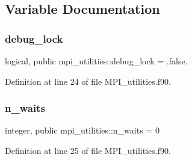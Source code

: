 \subsection{Variable Documentation}
\mbox{\label{namespacempi__utilities_a98291c400747762ea4e3f0d751c5d5f5}} 
\subsubsection{\texorpdfstring{debug\+\_\+lock}{debug\_lock}}
{\footnotesize\ttfamily logical, public mpi\+\_\+utilities\+::debug\+\_\+lock = .false.}



Definition at line 24 of file M\+P\+I\+\_\+utilities.\+f90.

\mbox{\label{namespacempi__utilities_a38a87fa6a7efbd985592bbef4750f02b}} 
\subsubsection{\texorpdfstring{n\+\_\+waits}{n\_waits}}
{\footnotesize\ttfamily integer, public mpi\+\_\+utilities\+::n\+\_\+waits = 0}



Definition at line 25 of file M\+P\+I\+\_\+utilities.\+f90.

